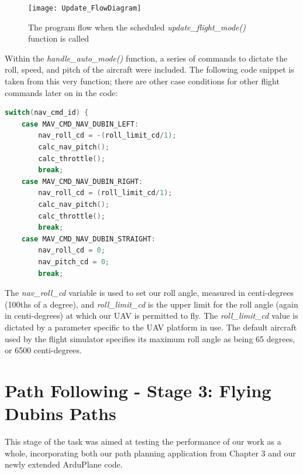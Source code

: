 \begin{figure}[htbp!] 
\centering    
\texttt{[image: Update\_FlowDiagram]}
\caption[Scheduled program flow to update the current ArduPlane flight mode]{The program flow when the scheduled \textit{update\_flight\_mode()} function is called}
\label{fig:updateFlow}
\end{figure}

Within the \textit{handle\_auto\_mode()} function, a series of commands to dictate the roll, speed, and pitch of the aircraft were included. The following code snippet is taken from this very function; there are other case conditions for other flight commands later on in the code:

\begin{minipage}{\linewidth}
\begin{lstlisting}[language=C++]
switch(nav_cmd_id) {
    case MAV_CMD_NAV_DUBIN_LEFT:
        nav_roll_cd = -(roll_limit_cd/1);
        calc_nav_pitch();
        calc_throttle();
        break;
    case MAV_CMD_NAV_DUBIN_RIGHT:
        nav_roll_cd = (roll_limit_cd/1);
        calc_nav_pitch();
        calc_throttle();
        break;
    case MAV_CMD_NAV_DUBIN_STRAIGHT:
        nav_roll_cd = 0;
        nav_pitch_cd = 0;
        break;
\end{lstlisting}
\end{minipage}

The \textit{nav\_roll\_cd} variable is used to set our roll angle, measured in centi-degrees (100ths of a degree), and \textit{roll\_limit\_cd} is the upper limit for the roll angle (again in centi-degrees) at which our UAV is permitted to fly. The \textit{roll\_limit\_cd} value is dictated by a parameter specific to the UAV platform in use. The default aircraft used by the flight simulator specifies its maximum roll angle as being 65 degrees, or 6500 centi-degrees. 


\section{Path Following - Stage 3: Flying Dubins Paths}
\label{task2:stage1}

This stage of the task was aimed at testing the performance of our work as a whole, incorporating both our path planning application from Chapter 3 and our newly extended ArduPlane code. 

